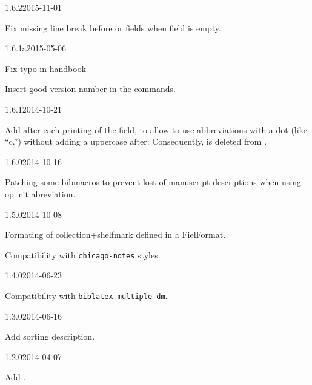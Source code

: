 \documentclass{ltxdockit}[2011/03/25]
\begin{document}
\begin{changelog}

\begin{release}{1.6.2}{2015-11-01}
	\item Fix missing line break before  or  fields when  field is empty.
\end{release}

\begin{release}{1.6.1a}{2015-05-06}
	\item Fix typo in handbook
	\item Insert good version number in the  commands.
\end{release}

\begin{release}{1.6.1}{2014-10-21}	
  	\item Add  after each printing of the  field, to allow to use abbreviations with a dot (like \enquote{c.}) without adding a uppercase after. Consequently,  is deleted from .
\end{release}

\begin{release}{1.6.0}{2014-10-16}	
  	\item Patching some bibmacros to prevent lost of manuscript descriptions when using  op. cit abreviation.
\end{release}

\begin{release}{1.5.0}{2014-10-08}	
  	\item Formating of collection+shelfmark defined in a FielFormat.
	\item Compatibility with \verb+chicago-notes+ styles.
\end{release}

\begin{release}{1.4.0}{2014-06-23}
	\item Compatibility with \verb+biblatex-multiple-dm+.
\end{release}


\begin{release}{1.3.0}{2014-06-16}
	\item Add sorting description.
\end{release}

\begin{release}{1.2.0}{2014-04-07}
	\item Add .
\end{release}


\end{changelog}
\end{document}
